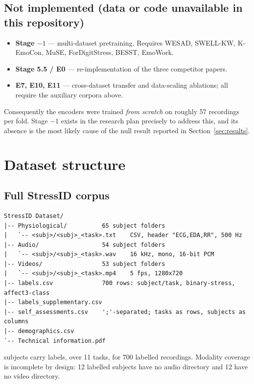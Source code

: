 \documentclass[11pt,a4paper]{article}
\begin{document}
\subsection*{Not implemented (data or code unavailable in this repository)}
\begin{itemize}\itemsep2pt
  \item \textbf{Stage $-1$} --- multi-dataset pretraining. Requires WESAD, SWELL-KW,
        K-EmoCon, MuSE, ForDigitStress, BESST, EmoWork.
  \item \textbf{Stage 5.5 / E0} --- re-implementation of the three competitor papers.
  \item \textbf{E7, E10, E11} --- cross-dataset transfer and data-scaling ablations;
        all require the auxiliary corpora above.
\end{itemize}

\noindent
Consequently the encoders were trained \emph{from scratch} on roughly 57 recordings per
fold. Stage $-1$ exists in the research plan precisely to address this, and its absence
is the most likely cause of the null result reported in Section~\ref{sec:results}.

\section{Dataset structure}

\subsection{Full StressID corpus}

\begin{Verbatim}[fontsize=\small,frame=single,framesep=3mm]
StressID Dataset/
|-- Physiological/          65 subject folders
|   `-- <subj>/<subj>_<task>.txt    CSV, header "ECG,EDA,RR", 500 Hz
|-- Audio/                  54 subject folders
|   `-- <subj>/<subj>_<task>.wav    16 kHz, mono, 16-bit PCM
|-- Videos/                 53 subject folders
|   `-- <subj>/<subj>_<task>.mp4    5 fps, 1280x720
|-- labels.csv              700 rows: subject/task, binary-stress, affect3-class
|-- labels_supplementary.csv
|-- self_assessments.csv    ';'-separated; tasks as rows, subjects as columns
|-- demographics.csv
`-- Technical information.pdf
\end{Verbatim}

 subjects carry labels, over 11 tasks, for 700 labelled recordings. Modality coverage
is incomplete by design: 12 labelled subjects have no audio directory and 12 have no
video directory.
\end{document}

